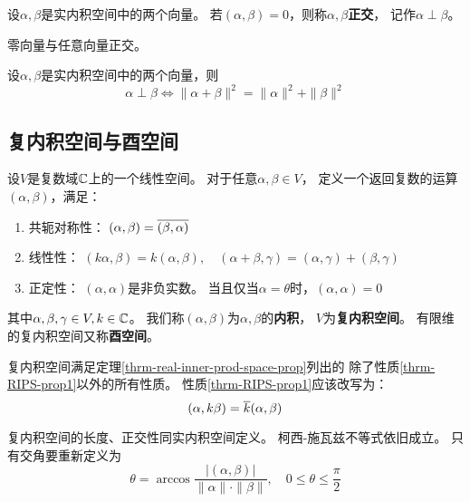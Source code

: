 \begin{definition}[正交]
  设$\alpha,\beta$是实内积空间中的两个向量。
  若$(\alpha,\beta)=0$，则称$\alpha,\beta$\textbf{正交}，
  记作$\alpha\perp\beta$。
\end{definition}

\begin{remark}
  零向量与任意向量正交。
\end{remark}

\begin{theorem}[正交的充要条件]
  设$\alpha,\beta$是实内积空间中的两个向量，则
  \begin{displaymath}
    \alpha\perp\beta \iff \|\alpha+\beta\|^2=\|\alpha\|^2+\|\beta\|^2
  \end{displaymath}
\end{theorem}

\subsection{复内积空间与酉空间}
\begin{definition}[复内积空间与酉空间]
  设$V$是复数域$\mathbb{C}$上的一个线性空间。
  对于任意$\alpha,\beta\in V$，
  定义一个返回复数的运算$(\alpha,\beta)$，满足：
  \begin{enumerate}
    \item 共轭对称性：
    $(\alpha,\beta)=\overline{(\beta,\alpha)}$
    \item 线性性：
    $(k\alpha,\beta)=k(\alpha,\beta),\quad
      (\alpha+\beta,\gamma)=(\alpha,\gamma)+(\beta,\gamma)$
    \item 正定性：
    $(\alpha,\alpha)$是非负实数。
    当且仅当$\alpha=\theta$时，$(\alpha,\alpha)=0$
  \end{enumerate}
  其中$\alpha,\beta,\gamma\in V, k\in\mathbb{C}$。
  我们称$(\alpha,\beta)$为$\alpha,\beta$的\textbf{内积}，
  $V$为\textbf{复内积空间}。
  有限维的复内积空间又称\textbf{酉空间}。
\end{definition}

\begin{theorem}[复内积空间的性质]
  复内积空间满足定理\ref{thrm-real-inner-prod-space-prop}列出的
  除了性质\ref{thrm-RIPS-prop1}以外的所有性质。
  性质\ref{thrm-RIPS-prop1}应该改写为：
  \[ (\alpha,k\beta)=\overline{k}(\alpha,\beta) \]
\end{theorem}

复内积空间的长度、正交性同实内积空间定义。
柯西-施瓦兹不等式依旧成立。
只有交角要重新定义为
\begin{displaymath}
  \theta = \arccos\frac{|(\alpha,\beta)|}{\|\alpha\|\cdot\|\beta\|},
  \quad 0\le\theta\le\frac{\pi}{2}
\end{displaymath}

